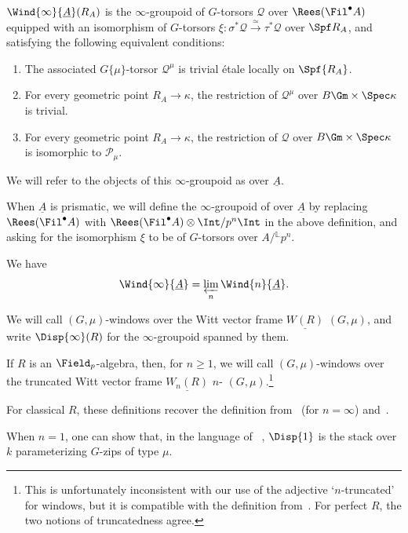\documentclass[10pt]{amsart}
\begin{document}
\begin{definition}
\label{defn:expl_desc_quotient}
$\Wind{\infty}{\underline{A}}({R_A})$ is the $\infty$-groupoid of $G$-torsors $\mathcal{Q}$ over $\Rees(\Fil^\bullet A)$ equipped with an isomorphism of $G$-torsors $\xi:\sigma^*\mathcal{Q}\xrightarrow{\simeq}\tau^*\mathcal{Q}$ over $\Spf R_A$, and satisfying the following equivalent conditions: 
\begin{enumerate}
   \item The associated $G\{\mu\}$-torsor $\mathcal{Q}^\mu$ is trivial \'etale locally on $\Spf {R_A}$.
   \item For every geometric point ${R_A}\to \kappa$, the restriction of $\mathcal{Q}^\mu$ over $B\Gm\times\Spec \kappa$ is trivial.
   \item For every geometric point $R_A\to \kappa$, the restriction of $\mathcal{Q}$ over $B\Gm\times\Spec \kappa$ is isomorphic to $\mathcal{P}_\mu$.
\end{enumerate}
We will refer to the objects of this $\infty$-groupoid as  over $\underline{A}$.

When $\underline{A}$ is prismatic, we will define the $\infty$-groupoid of  over $\underline{A}$ by replacing $\Rees(\Fil^\bullet A)$ with $\Rees(\Fil^\bullet A)\otimes\Int/p^n\Int$ in the above definition, and asking for the isomorphism $\xi$ to be of $G$-torsors over $A/{}^{\mathbb{L}}p^n$.

We have
\[
\Wind{\infty}{\underline{A}} = \varprojlim_n \Wind{n}{\underline{A}}.
\]
\end{definition}



\begin{definition}
\label{defn:displays}
We will call $(G,\mu)$-windows over the Witt vector frame $\underline{W(R)}$ $(G,\mu)$, and write $\Disp{\infty}(R)$ for the $\infty$-groupoid spanned by them. 

If $R$ is an $\Field_p$-algebra, then, for $n\ge 1$, we will call $(G,\mu)$-windows over the truncated Witt vector frame $\underline{W_n(R)}$ $n$- $(G,\mu)$.\footnote{This is unfortunately inconsistent with our use of the adjective `$n$-truncated' for windows, but it is compatible with the definition from~\cite{MR2983008}. For perfect $R$, the two notions of truncatedness agree.}

For classical $R$, these definitions recover the definition from~\cite{MR4120808} (for $n=\infty$) and~\cite[\S 5]{MR4355476}.

When $n=1$, one can show that, in the language of ~\cite{Pink2015-ye}, $\Disp{1}$ is the stack over $k$ parameterizing $G$-zips of type $\mu$.
\end{definition}
\end{document}
